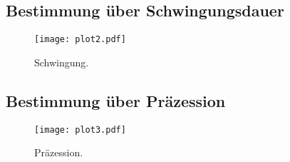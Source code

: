 \subsection{Bestimmung über Schwingungsdauer}

\begin{figure}
  \centering
  \texttt{[image: plot2.pdf]}
  \caption{Schwingung.}
  \label{fig:plot2}
\end{figure}

\subsection{Bestimmung über Präzession}

\begin{figure}
  \centering
  \texttt{[image: plot3.pdf]}
  \caption{Präzession.}
  \label{fig:plot3}
\end{figure}
